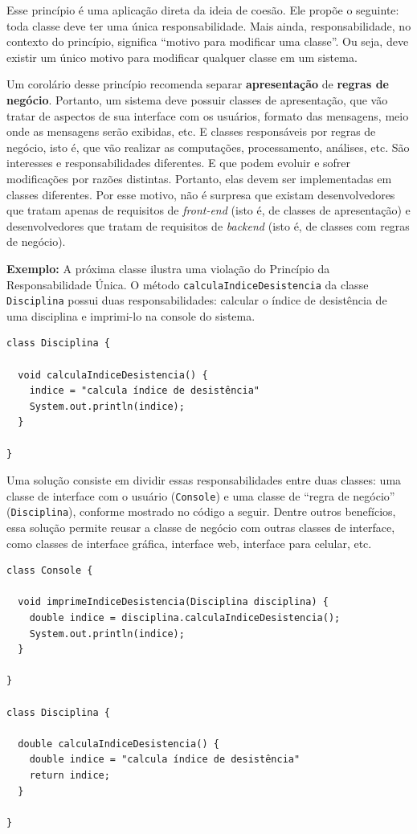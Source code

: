 \documentclass[
  11pt,
  twoside]{book}
\newcommand{\passthrough}[1]{#1}
\begin{document}

Esse princípio é uma aplicação direta da ideia de coesão. Ele propõe o
seguinte: toda classe deve ter uma única responsabilidade. Mais ainda,
responsabilidade, no contexto do princípio, significa ``motivo para
modificar uma classe''. Ou seja, deve existir um único motivo para
modificar qualquer classe em um sistema.

Um corolário desse princípio recomenda separar \textbf{apresentação} de
\textbf{regras de negócio}. Portanto, um sistema deve possuir classes de
apresentação, que vão tratar de aspectos de sua interface com os
usuários, formato das mensagens, meio onde as mensagens serão exibidas,
etc. E classes responsáveis por regras de negócio, isto é, que vão
realizar as computações, processamento, análises, etc. São interesses e
responsabilidades diferentes. E que podem evoluir e sofrer modificações
por razões distintas. Portanto, elas devem ser implementadas em classes
diferentes. Por esse motivo, não é surpresa que existam desenvolvedores
que tratam apenas de requisitos de \emph{front-end} (isto é, de classes
de apresentação) e desenvolvedores que tratam de requisitos de
\emph{backend} (isto é, de classes com regras de negócio).

\textbf{Exemplo:} A próxima classe ilustra uma violação do Princípio da
Responsabilidade Única. O método
\passthrough{\lstinline!calculaIndiceDesistencia!} da classe
\passthrough{\lstinline!Disciplina!} possui duas responsabilidades:
calcular o índice de desistência de uma disciplina e imprimi-lo na
console do sistema.

\begin{lstlisting}
class Disciplina {

  void calculaIndiceDesistencia() {
    indice = "calcula índice de desistência"
    System.out.println(indice);
  }

}
\end{lstlisting}

Uma solução consiste em dividir essas responsabilidades entre duas
classes: uma classe de interface com o usuário
(\passthrough{\lstinline!Console!}) e uma classe de ``regra de negócio''
(\passthrough{\lstinline!Disciplina!}), conforme mostrado no código a
seguir. Dentre outros benefícios, essa solução permite reusar a classe
de negócio com outras classes de interface, como classes de interface
gráfica, interface web, interface para celular, etc.

\begin{lstlisting}
class Console {

  void imprimeIndiceDesistencia(Disciplina disciplina) {
    double indice = disciplina.calculaIndiceDesistencia();
    System.out.println(indice);
  }

}

class Disciplina {

  double calculaIndiceDesistencia() {
    double indice = "calcula índice de desistência"
    return indice;
  }

}
\end{lstlisting}
\end{document}

